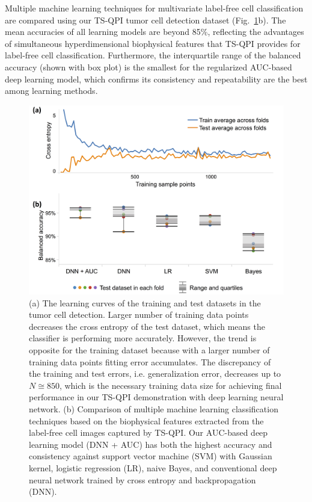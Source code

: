 \documentclass[aps,pra,reprint,superscriptaddress]{revtex4-1}
\begin{document}
Multiple machine learning techniques for multivariate label-free cell classification are compared using our TS-QPI tumor cell detection dataset (Fig.~\ref{fig:LearningCurve}b). The mean accuracies of all learning models are beyond 85\%, reflecting the advantages of simultaneous hyperdimensional biophysical features that TS-QPI provides for label-free cell classification. Furthermore, the interquartile range of the balanced accuracy (shown with box plot) is the smallest for the regularized AUC-based deep learning model, which confirms its consistency and repeatability are the best among learning methods.

\begin{figure}
\includegraphics[scale=0.08]{FigureLearningCurve.jpg}
\caption{\label{fig:LearningCurve} (a) The learning curves of the training and test datasets in the tumor cell detection. Larger number of training data points decreases the cross entropy of the test dataset, which means the classifier is performing more accurately. However, the trend is opposite for the training dataset because with a larger number of training data points fitting error accumulates. The discrepancy of the training and test errors, i.e. generalization error, decreases up to $N \cong 850$, which is the necessary training data size for achieving final performance in our TS-QPI demonstration with deep learning neural network. (b) Comparison of multiple machine learning classification techniques based on the biophysical features extracted from the label-free cell images captured by TS-QPI. Our AUC-based deep learning model (DNN + AUC) has both the highest accuracy and consistency against support vector machine (SVM) with Gaussian kernel, logistic regression (LR), naive Bayes, and conventional deep neural network trained by cross entropy and backpropagation (DNN).}
\end{figure}
\end{document}
